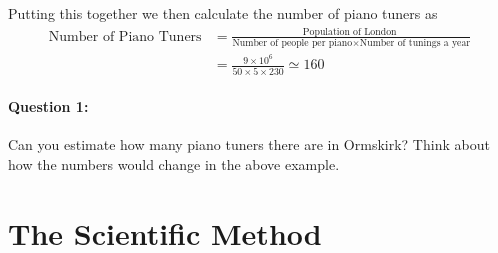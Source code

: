 \documentclass[a4paper,12pt]{book}
\begin{document}
Putting this together we then calculate the number of piano tuners as
\begin{align*}
    \text{Number of Piano Tuners} &= \frac{\text{Population of London }}{\text{Number of people per piano} \times \text{Number of tunings a year}}\\
    &=\frac{9\times 10^{6}}{50\times 5\times 230}\simeq 160
\end{align*}

\paragraph{Question 1:}Can you estimate how many piano tuners there are in Ormskirk? Think about how the numbers would change in the above example.\\




\section{The Scientific Method}
\end{document}
